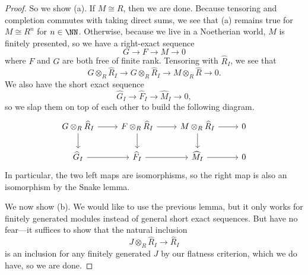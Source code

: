 \begin{proof}
	So we show (a). If $M\cong R$, then we are done. Because tensoring and completion commutes with taking direct sums, we see that (a) remains true for $M\cong R^n$ for $n\in\NN$. Otherwise, because we live in a Noetherian world, $M$ is finitely presented, so we have a right-exact sequence
	\[G\to F\to M\to 0\]
	where $F$ and $G$ are both free of finite rank. Tensoring with $\widehat R_I$, we see that
	\[G\otimes_R\widehat R_I\to G\otimes_R\widehat R_I\to M\otimes_R\widehat R\to0.\]
	We also have the short exact sequence
	\[\widehat G_I\to\widehat F_I\to\widehat M_I\to0,\]
	so we slap them on top of each other to build the following diagram.
	\[\begin{tikzcd}
		{G\otimes_R\widehat R_I} & {F\otimes_R\widehat R_I} & {M\otimes_R\widehat R_I} & 0 \\
		{\widehat G_I} & {\widehat F_I} & {\widehat M_I} & 0
		\arrow[from=1-1, to=1-2]
		\arrow[from=1-2, to=1-3]
		\arrow[from=1-3, to=1-4]
		\arrow[from=2-1, to=2-2]
		\arrow[from=2-2, to=2-3]
		\arrow[from=2-3, to=2-4]
		\arrow[from=1-1, to=2-1]
		\arrow[from=1-2, to=2-2]
		\arrow[from=1-3, to=2-3]
	\end{tikzcd}\]
	In particular, the two left maps are isomorphisms, so the right map is also an isomorphism by the Snake lemma.

	We now show (b). We would like to use the previous lemma, but it only works for finitely generated modules instead of general short exact sequences. But have no fear---it suffices to show that the natural inclusion
	\[J\otimes_R\widehat R_I\to\widehat R_I\]
	is an inclusion for any finitely generated $J$ by our flatness criterion, %
	which we do have, so we are done.
\end{proof}

